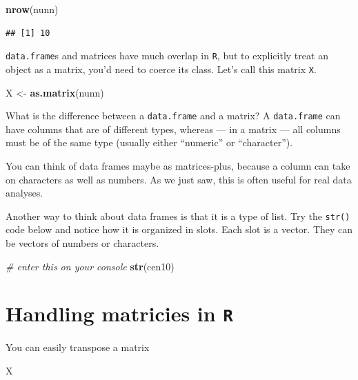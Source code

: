 \documentclass[
]{book}
\newenvironment{Shaded}{\begin{snugshade}}{\end{snugshade}}
\newcommand{\CommentTok}[1]{\textcolor[rgb]{0.56,0.35,0.01}{\textit{#1}}}
\newcommand{\KeywordTok}[1]{\textcolor[rgb]{0.13,0.29,0.53}{\textbf{#1}}}
\newcommand{\NormalTok}[1]{#1}
\newcommand{\StringTok}[1]{\textcolor[rgb]{0.31,0.60,0.02}{#1}}
\theoremstyle{definition}
\theoremstyle{definition}
\theoremstyle{definition}
\theoremstyle{definition}
\theoremstyle{remark}
\begin{document}
\begin{Shaded}
\begin{Highlighting}[]
\KeywordTok{nrow}\NormalTok{(nunn)}
\end{Highlighting}
\end{Shaded}

\begin{verbatim}
## [1] 10
\end{verbatim}

\texttt{data.frame}s and matrices have much overlap in \texttt{R}, but to explicitly treat an object as a matrix, you'd need to coerce its class. Let's call this matrix \texttt{X}.

\begin{Shaded}
\begin{Highlighting}[]
\NormalTok{X <-}\StringTok{ }\KeywordTok{as.matrix}\NormalTok{(nunn)}
\end{Highlighting}
\end{Shaded}

What is the difference between a \texttt{data.frame} and a matrix? A \texttt{data.frame} can have columns that are of different types, whereas --- in a matrix --- all columns must be of the same type (usually either ``numeric'' or ``character'').

You can think of data frames maybe as matrices-plus, because a column can take on characters as well as numbers. As we just saw, this is often useful for real data analyses.

Another way to think about data frames is that it is a type of list. Try the \texttt{str()} code below and notice how it is organized in slots. Each slot is a vector. They can be vectors of numbers or characters.

\begin{Shaded}
\begin{Highlighting}[]
\CommentTok{# enter this on your console}
\KeywordTok{str}\NormalTok{(cen10)}
\end{Highlighting}
\end{Shaded}

\hypertarget{handling-matricies-in-r}{%
\section{\texorpdfstring{Handling matricies in \texttt{R}}{Handling matricies in R}}\label{handling-matricies-in-r}}

You can easily transpose a matrix

\begin{Shaded}
\begin{Highlighting}[]
\NormalTok{X}
\end{Highlighting}
\end{Shaded}
\end{document}

